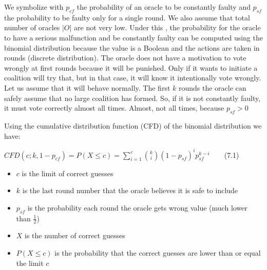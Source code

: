 \documentclass{article}
\begin{document}
We symbolize with $p_{cf}$ the probability of an oracle to be constantly faulty and $p_{sf}$ the probability to be faulty only for a single round. We also assume that total number of oracles $|O|$ are not very low. Under this , the probability for the oracle to have a serious malfunction and be constantly faulty can be computed using the binomial distribution because the value is a Boolean and the actions are taken in rounds (discrete distribution). The oracle does not have a motivation to vote wrongly at first rounds because it will be punished. Only if it wants to initiate a coalition will try that, but in that case, it will know it intentionally vote wrongly. Let us assume that it will behave normally. The first $k$ rounds the oracle can safely assume that no large coalition has formed. So, if it is not constantly faulty, it must vote correctly almost all times. Almost, not all times, because  $p_{sf}>0$
\par Using the cumulative distribution function (CFD) of the binomial distribution we have:\par
$CFD(c;k,1-p_{cf})=P(X\leq c)= \displaystyle\sum^c_{i=1} {k\choose i}(1-p_{sf})^{i}p_{sf}^{k-i}$~~~~(7.1)
\begin{itemize}
\item $c$ is the limit of correct guesses
\item $k$ is the last round number that the oracle believes it is safe to include
\item $p_{sf}$ is the probability each round the oracle gets wrong value (much lower than $\frac{1}{2}$)
\item $X$ is the number of correct guesses
\item $P(X\leq c)$ is the probability that the correct guesses are lower than or equal the limit $c$
\end{itemize}
\end{document}

